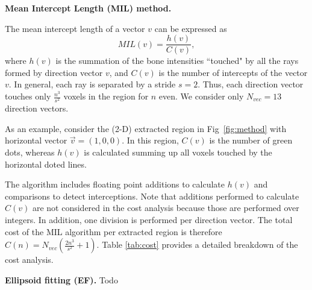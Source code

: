 \documentclass[letterpaper]{article}
\newcommand{\mypar}[1]{{\bf #1.}}
\begin{document}
\mypar{Mean Intercept Length (MIL) method}

The mean intercept length of a vector ${v}$ can be expressed as
\begin{equation}
  MIL({v}) = \frac{h({v})}{C({v})},
\end{equation}
where $h(v)$ is the summation of the bone intensities ``touched" by all the rays formed by direction vector $v$, and $C(v)$ is the number of intercepts of the vector $v$.  In general, each ray is separated by a stride $s=2$. Thus, each direction vector touches only $\frac{n^3}{s^2}$ voxels in the region for $n$ even. We consider only $N_{vec}=13$ direction vectors.

As an example, consider the (2-D) extracted region in Fig~\ref{fig:method} with horizontal vector $\vec{v} = (1,0,0)$. In this region, $C({v})$ is the number of green dots, whereas $h({v})$ is calculated summing up all voxels touched by the horizontal doted lines.


The algorithm includes floating point additions to calculate $h({v})$ and comparisons to detect interceptions. Note that additions performed to calculate $C({v})$ are not considered in the cost analysis because those are performed over integers. In addition, one division is performed per direction vector. The total cost of the MIL algorithm per extracted region is therefore $C(n) = N_{vec}(\frac{2n^3}{s^2}+1)$. Table \ref{tab:cost} provides a detailed breakdown of the cost analysis.

\mypar{Ellipsoid fitting (EF)}  
{\color{red}Todo}

\end{document}
